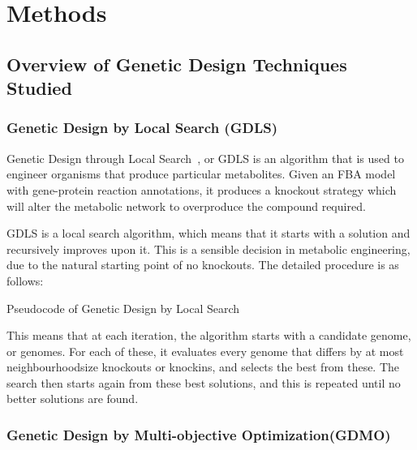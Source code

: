 \chapter{Methods}

\section{Overview of Genetic Design Techniques Studied}

\subsection{Genetic Design by Local Search (GDLS)}
Genetic Design through Local Search~\cite{Lun2009}, or GDLS is an algorithm that is used to engineer organisms that produce particular metabolites. 
Given an FBA model with gene-protein reaction annotations, it produces a knockout strategy which will alter the metabolic network to overproduce the compound required.

GDLS is a local search algorithm, which means that it starts with a solution and recursively improves upon it. 
This is a sensible decision in metabolic engineering, due to the natural starting point of no knockouts. 
The detailed procedure is as follows:

\begin{algorithm}
\caption{Pseudocode of Genetic Design by Local Search}
\label{alg:GDLS}
\begin{algorithmic}
\EndWhile
\end{algorithmic}
\end{algorithm}

This means that at each iteration, the algorithm starts with a candidate genome, or genomes. For each of these, it evaluates every genome that differs by at most neighbourhoodsize knockouts or knockins, and selects the best from these. The search then starts again from these best solutions, and this is repeated until no better solutions are found. 

\subsection{Genetic Design by Multi-objective Optimization(GDMO)} 

